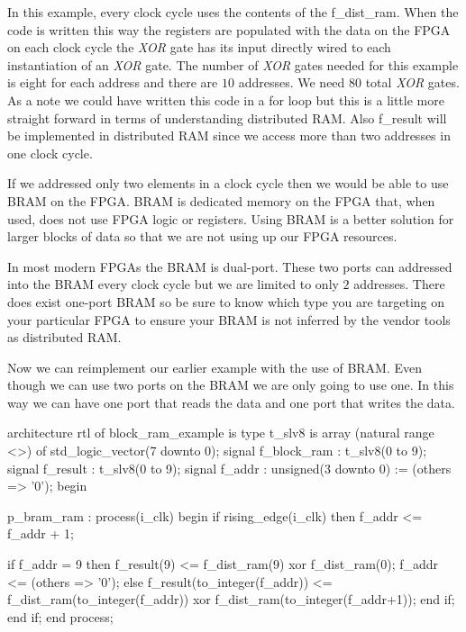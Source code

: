 In this example, every clock cycle uses the contents of the f\_dist\_ram. When the code is written this way the registers are populated with the data on the \ac{FPGA} on each clock cycle the \emph{XOR} gate has its input directly wired to each instantiation of an \emph{XOR} gate. The number of \emph{XOR} gates needed for this example is eight for each address and there are $10$ addresses. We need $80$ total \emph{XOR} gates. As a note we could have written this code in a for loop but this is a little more straight forward in terms of understanding distributed \ac{RAM}. Also f\_result will be implemented in distributed \ac{RAM} since we access more than two addresses in one clock cycle. 

If we addressed only two elements in a clock cycle then we would be able to use \ac{BRAM} on the \ac{FPGA}. \ac{BRAM} is dedicated memory on the \ac{FPGA} that, when used, does not use \ac{FPGA} logic or registers. Using \ac{BRAM} is a better solution for larger blocks of data so that we are not using up our \ac{FPGA} resources. 

In most modern \ac{FPGA}s the \ac{BRAM} is dual-port. These two ports can addressed into the \ac{BRAM} every clock cycle but we are limited to only $2$ addresses. There does exist one-port \ac{BRAM} so be sure to know which type you are targeting on your particular \ac{FPGA} to ensure your \ac{BRAM} is not inferred by the vendor tools as distributed \ac{RAM}.

Now we can reimplement our earlier example with the use of \ac{BRAM}. Even though we can use two ports on the \ac{BRAM} we are only going to use one. In this way we can have one port that reads the data and one port that writes the data. 

\begin{VHDLlisting}[tabsize=4]
architecture rtl of block_ram_example is
	type t_slv8 is array (natural range <>) of std_logic_vector(7 downto 0);
	signal f_block_ram : t_slv8(0 to 9);
	signal f_result    : t_slv8(0 to 9);
	signal f_addr      : unsigned(3 downto 0) := (others => '0');
begin

p_bram_ram : process(i_clk)
begin
	if rising_edge(i_clk) then
		f_addr <= f_addr + 1;
		
		if f_addr = 9 then
			f_result(9) <= f_dist_ram(9) xor f_dist_ram(0);
			f_addr <= (others => '0');
		else
			f_result(to_integer(f_addr)) <= f_dist_ram(to_integer(f_addr)) xor 
										    f_dist_ram(to_integer(f_addr+1));
		end if;
	end if;
end process;
\end{VHDLlisting}

